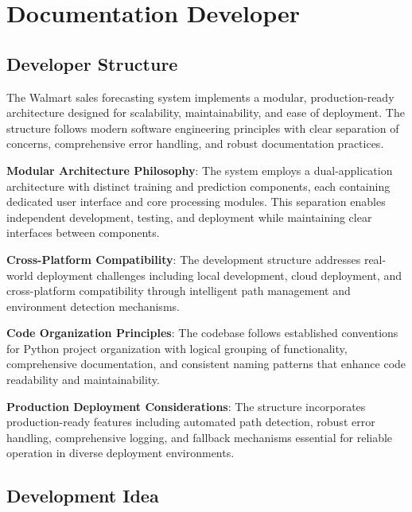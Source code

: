 %
%
%

\chapter{Documentation Developer}

\section{Developer Structure}

The Walmart sales forecasting system implements a modular, production-ready architecture designed for scalability, maintainability, and ease of deployment. The structure follows modern software engineering principles with clear separation of concerns, comprehensive error handling, and robust documentation practices.

\textbf{Modular Architecture Philosophy}: The system employs a dual-application architecture with distinct training and prediction components, each containing dedicated user interface and core processing modules. This separation enables independent development, testing, and deployment while maintaining clear interfaces between components.

\textbf{Cross-Platform Compatibility}: The development structure addresses real-world deployment challenges including local development, cloud deployment, and cross-platform compatibility through intelligent path management and environment detection mechanisms.

\textbf{Code Organization Principles}: The codebase follows established conventions for Python project organization with logical grouping of functionality, comprehensive documentation, and consistent naming patterns that enhance code readability and maintainability.

\textbf{Production Deployment Considerations}: The structure incorporates production-ready features including automated path detection, robust error handling, comprehensive logging, and fallback mechanisms essential for reliable operation in diverse deployment environments.

\section{Development Idea}

